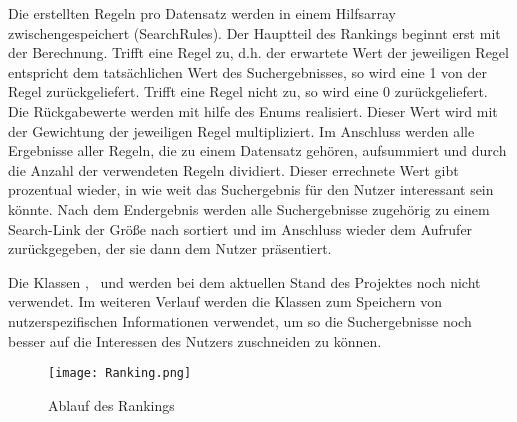 Die erstellten Regeln pro Datensatz werden in einem Hilfsarray zwischengespeichert (SearchRules). Der Hauptteil des Rankings beginnt erst mit der Berechnung. Trifft eine Regel zu, d.h. der erwartete Wert der jeweiligen Regel entspricht dem tatsächlichen Wert des Suchergebnisses, so wird eine 1 von der Regel zurückgeliefert. Trifft eine Regel nicht zu, so wird eine 0 zurückgeliefert. Die Rückgabewerte werden mit hilfe des Enums \glqq\RuleMatch\grqq\xspace realisiert. Dieser Wert wird mit der Gewichtung der jeweiligen Regel multipliziert. Im Anschluss werden alle Ergebnisse aller Regeln, die zu einem Datensatz gehören, aufsummiert und durch die Anzahl der verwendeten Regeln dividiert. Dieser errechnete Wert gibt prozentual wieder, in wie weit das Suchergebnis für den Nutzer interessant sein könnte. Nach dem Endergebnis werden alle Suchergebnisse zugehörig zu einem Search-Link der Größe nach sortiert und im Anschluss wieder dem Aufrufer zurückgegeben, der sie dann dem Nutzer präsentiert. 

Die Klassen \glqq\PersistenceController\grqq\xspace, \glqq\RankingDataObject\grqq\ und \glqq\RankingDataObjectPersistency\grqq\xspace werden bei dem aktuellen Stand des Projektes noch nicht verwendet. Im weiteren Verlauf werden die Klassen zum Speichern von nutzerspezifischen Informationen verwendet, um so die Suchergebnisse noch besser auf die Interessen des Nutzers zuschneiden zu können.

\begin{figure}[h]
	\centering
	\texttt{[image: Ranking.png]}
	\caption{Ablauf des Rankings}
	\label{fig:Rankingablauf}
\end{figure}


